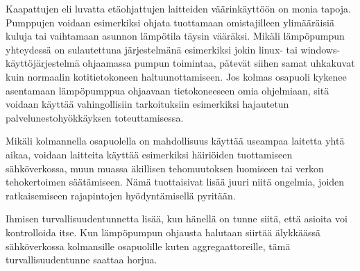   Kaapattujen eli luvatta etäohjattujen laitteiden väärinkäyttöön on monia tapoja. Pumppujen voidaan esimerkiksi ohjata tuottamaan omistajilleen ylimääräisiä kuluja tai vaihtamaan asunnon lämpötila täysin vääräksi. Mikäli lämpöpumpun yhteydessä on sulautettuna järjestelmänä esimerkiksi jokin linux- tai windows-käyttöjärjestelmä ohjaamassa pumpun toimintaa, pätevät siihen samat uhkakuvat kuin normaalin kotitietokoneen haltuunottamiseen. Jos kolmas osapuoli kykenee asentamaan lämpöpumppua ohjaavaan tietokoneeseen omia ohjelmiaan, sitä voidaan käyttää vahingollisiin tarkoituksiin esimerkiksi hajautetun palvelunestohyökkäyksen toteuttamisessa.

  Mikäli kolmannella osapuolella on mahdollisuus käyttää useampaa laitetta yhtä aikaa, voidaan laitteita käyttää esimerkiksi häiriöiden tuottamiseen sähköverkossa, muun muassa äkillisen tehomuutoksen luomiseen tai verkon tehokertoimen säätämiseen. Nämä tuottaisivat lisää juuri niitä ongelmia, joiden ratkaisemiseen rajapintojen hyödyntämisellä pyritään.

  Ihmisen turvallisuudentunnetta lisää, kun hänellä on tunne siitä, että asioita voi kontrolloida itse. Kun lämpöpumpun ohjausta halutaan siirtää älykkäässä sähköverkossa kolmansille osapuolille kuten aggregaattoreille, tämä turvallisuudentunne saattaa horjua.
